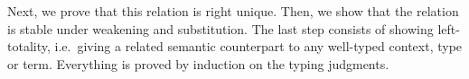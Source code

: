 Next, we prove that this relation is right unique.  Then, we show that the
relation is stable under weakening and substitution.  The last step consists of
showing left-totality, i.e.\ giving a related semantic counterpart to any
well-typed context, type or term.  Everything is proved by induction on the typing
judgments.
